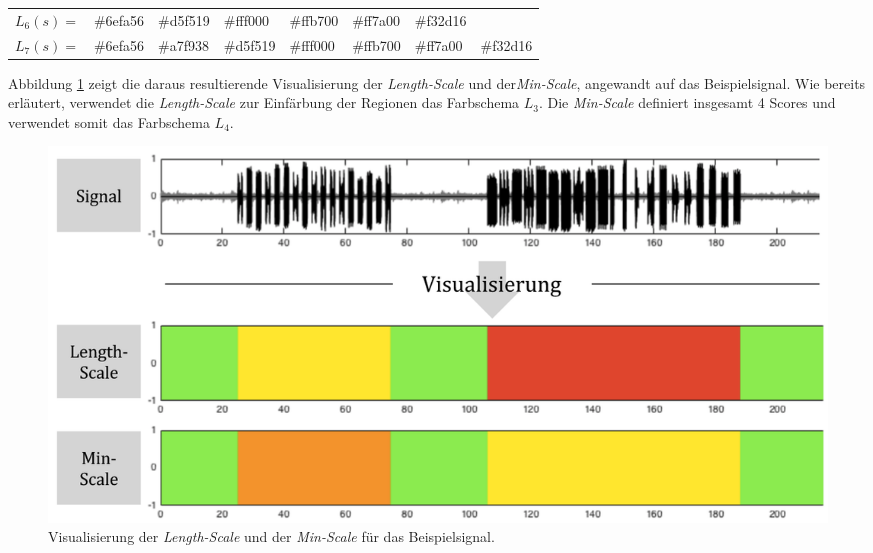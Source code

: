 \begin{table}[h]
\begin{tabular}{@{}clllllll@{}}
\multicolumn{1}{l|}{$L_6(s) = $} & \multicolumn{1}{l|}{\cellcolor[HTML]{6EFA56}\#6efa56} & \multicolumn{1}{l|}{\cellcolor[HTML]{D5F519}\#d5f519} & \multicolumn{1}{l|}{\cellcolor[HTML]{FFF000}\#fff000} & \multicolumn{1}{l|}{\cellcolor[HTML]{FFB700}\#ffb700} & \multicolumn{1}{l|}{\cellcolor[HTML]{FF7A00}\#ff7a00} & \multicolumn{1}{l|}{\cellcolor[HTML]{F32D16}\#f32d16} &                                                       \\ \cmidrule(l){2-8} 
\multicolumn{1}{l|}{$L_7(s) = $} & \multicolumn{1}{l|}{\cellcolor[HTML]{6EFA56}\#6efa56} & \multicolumn{1}{l|}{\cellcolor[HTML]{A7F938}\#a7f938} & \multicolumn{1}{l|}{\cellcolor[HTML]{D5F519}\#d5f519} & \multicolumn{1}{l|}{\cellcolor[HTML]{FFF000}\#fff000} & \multicolumn{1}{l|}{\cellcolor[HTML]{FFB700}\#ffb700} & \multicolumn{1}{l|}{\cellcolor[HTML]{FF7A00}\#ff7a00} & \multicolumn{1}{l|}{\cellcolor[HTML]{F32D16}\#f32d16} \\ \bottomrule
\end{tabular}
\end{table}

Abbildung \ref{fig:viz_without_t_01} zeigt die daraus resultierende Visualisierung der \emph{Length-Scale} und der\emph{Min-Scale}, angewandt auf das Beispielsignal. Wie bereits erläutert, verwendet die \emph{Length-Scale} zur Einfärbung der Regionen das Farbschema $L_3$. Die \emph{Min-Scale} definiert insgesamt 4 Scores und verwendet somit das Farbschema $L_4$.

\begin{figure}[h]
	\centering
	\includegraphics[width=1\textwidth]{bilder/viz_without_t_04.png}
	\caption{Visualisierung der \emph{Length-Scale} und der \emph{Min-Scale} für das Beispielsignal. }
	\label{fig:viz_without_t_01}
\end{figure}

